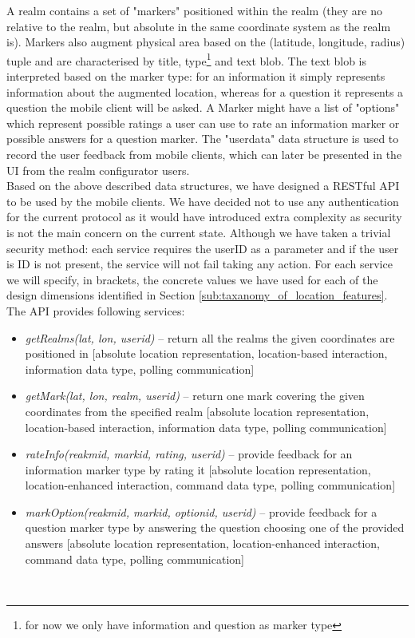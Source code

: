 \noindent A realm contains a set of "markers" positioned within the realm (they are no relative to the realm, but absolute in the same coordinate system as the realm is). Markers also augment physical area based on the (latitude, longitude, radius) tuple and are characterised by title, type\footnote{for now we only have information and question as marker type} and text blob. The text blob is interpreted based on the marker type: for an information it simply represents information about the augmented location, whereas for a question it represents a question the mobile client will be asked. A Marker might have a list of "options" which represent possible ratings a user can use to rate an information marker or possible answers for a question marker. The "userdata" data structure is used to record the user feedback from mobile clients, which can later be presented in the UI from the realm configurator users.
\\

\noindent Based on the above described data structures, we have designed a RESTful API to be used by the mobile clients. We have decided not to use any authentication for the current protocol as it would have introduced extra complexity as security is not the main concern on the current state. Although we have taken a trivial security method: each service requires the userID as a parameter and if the user is ID is not present, the service will not fail taking any action. For each service we will specify, in brackets, the concrete values we have used for each of the design dimensions identified in Section \ref{sub:taxanomy_of_location_features}. The API provides following services:
\begin{itemize}
	\item \emph{getRealms(lat, lon, userid)} -- return all the realms the given coordinates are positioned in [absolute location representation, location-based interaction, information data type, polling communication]
	\item \emph{getMark(lat, lon, realm, userid)} -- return one mark covering the given coordinates from the specified realm [absolute location representation, location-based interaction, information data type, polling communication]
	\item \emph{rateInfo(reakmid, markid, rating, userid)} -- provide feedback for an information marker type by rating it [absolute location representation, location-enhanced interaction, command data type, polling communication]
	\item \emph{markOption(reakmid, markid, optionid, userid)} -- provide feedback for a question marker type by answering the question choosing one of the provided answers [absolute location representation, location-enhanced interaction, command data type, polling communication]
\end{itemize}
\\

